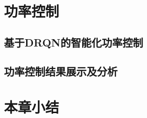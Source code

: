 \section{功率控制}
\subsection{基于DRQN的智能化功率控制}

\subsection{功率控制结果展示及分析}



\section{本章小结}






















